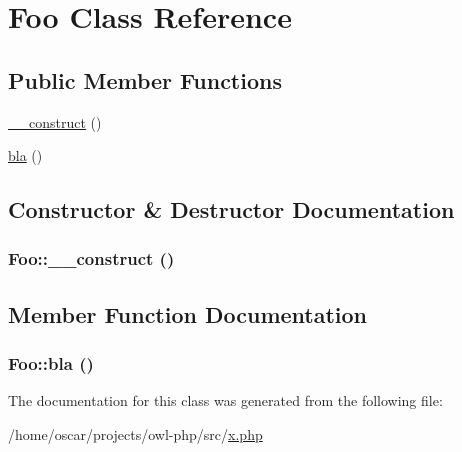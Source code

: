 \section{Foo Class Reference}
\label{classFoo}
\subsection*{Public Member Functions}
\begin{DoxyCompactItemize}
\item 
\hyperlink{classFoo_ac2e1082a84786b337557e7b847db7979}{\_\-\_\-construct} ()
\item 
\hyperlink{classFoo_a221a21ffd0ba9b7d090532f452611985}{bla} ()
\end{DoxyCompactItemize}


\subsection{Constructor \& Destructor Documentation}
\subsubsection[{\_\-\_\-construct}]{\setlength{\rightskip}{0pt plus 5cm}Foo::\_\-\_\-construct ()}\label{classFoo_ac2e1082a84786b337557e7b847db7979}


\subsection{Member Function Documentation}
\subsubsection[{bla}]{\setlength{\rightskip}{0pt plus 5cm}Foo::bla ()}\label{classFoo_a221a21ffd0ba9b7d090532f452611985}


The documentation for this class was generated from the following file:\begin{DoxyCompactItemize}
\item 
/home/oscar/projects/owl-\/php/src/\hyperlink{x_8php}{x.php}\end{DoxyCompactItemize}
